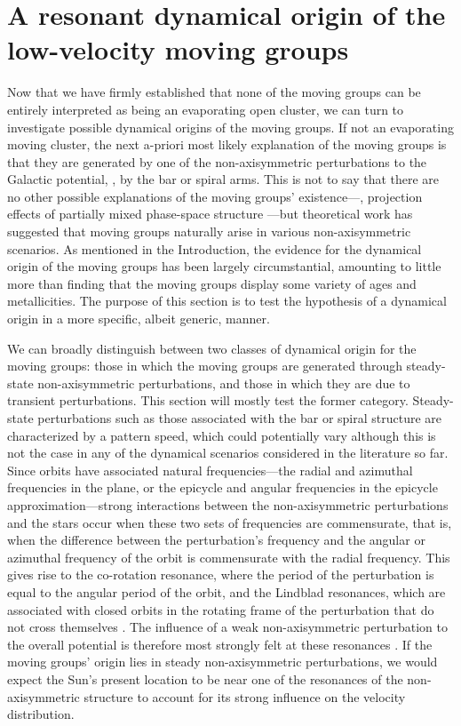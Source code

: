 \section{A resonant dynamical origin of the low-velocity moving groups}\label{sec:dynamics}

Now that we have firmly established that none of the moving groups can
be entirely interpreted as being an evaporating open cluster, we can
turn to investigate possible dynamical origins of the moving
groups. If not an evaporating moving cluster, the next a-priori most
likely explanation of the moving groups is that they are generated by
one of the non-axisymmetric perturbations to the Galactic potential,
\eg, by the bar or spiral arms. This is not to say that there are no
other possible explanations of the moving groups' existence---\eg,
projection effects of partially mixed phase-space structure
\citep{1999MNRAS.307..877T}---but theoretical work has suggested that moving
groups naturally arise in various non-axisymmetric scenarios. As
mentioned in the Introduction, the evidence for the dynamical origin
of the moving groups has been largely circumstantial, amounting to
little more than finding that the moving groups display some variety
of ages and metallicities. The purpose of this section is to test the
hypothesis of a dynamical origin in a more specific, albeit generic,
manner.

We can broadly distinguish between two classes of dynamical origin for
the moving groups: those in which the moving groups are generated
through steady-state non-axisymmetric perturbations, and those in
which they are due to transient perturbations. This section will
mostly test the former category. Steady-state perturbations such as
those associated with the bar or spiral structure are characterized by
a pattern speed, which could potentially vary although this is not the
case in any of the dynamical scenarios considered in the literature so
far. Since orbits have associated natural frequencies---the radial and
azimuthal frequencies in the plane, or the epicycle and angular
frequencies in the epicycle approximation---strong interactions
between the non-axisymmetric perturbations and the stars occur when
these two sets of frequencies are commensurate, that is, when the
difference between the perturbation's frequency and the angular or
azimuthal frequency of the orbit is commensurate with the radial
frequency. This gives rise to the co-rotation resonance, where the
period of the perturbation is equal to the angular period of the
orbit, and the Lindblad resonances, which are associated with closed
orbits in the rotating frame of the perturbation that do not cross
themselves \citep[\eg,][]{2008gady.book.....B}. The influence of a
weak non-axisymmetric perturbation to the overall potential is
therefore most strongly felt at these resonances
\citep[\eg,][]{LyndenBell72a}. If the moving groups' origin lies in
steady non-axisymmetric perturbations, we would expect the Sun's
present location to be near one of the resonances of the
non-axisymmetric structure to account for its strong influence on the
velocity distribution.

